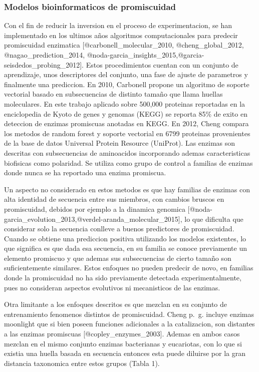 \documentclass[]{article}
\begin{document}
\subsubsection{Modelos bioinformaticos de
promiscuidad}\label{modelos-bioinformaticos-de-promiscuidad}

Con el fin de reducir la inversion en el proceso de experimentacion, se
han implementado en los ultimos años algoritmos computacionales para
predecir promiscuidad enzimatica {[}@carbonell\_molecular\_2010,
@cheng\_global\_2012, @nagao\_prediction\_2014,
@noda-garcia\_insights\_2015,@garcia-seisdedos\_probing\_2012{]}. Estos
procedimientos cuentan con un conjunto de aprendizaje, unos descriptores
del conjunto, una fase de ajuste de parametros y finalmente una
prediccion. En 2010, Carbonell propone un algoritmo de soporte vectorial
basado en subsecuencias de distinto tamaño que llama huellas
moleculares. En este trabajo aplicado sobre 500,000 proteinas reportadas
en la enciclopedia de Kyoto de genes y genomas (KEGG) se reporta 85\% de
exito en deteccion de enzimas promiscuas anotadas en KEGG. En 2012,
Cheng compara los metodos de random forest y soporte vectorial en 6799
proteinas provenientes de la base de datos Universal Protein Resource
(UniProt). Las enzimas son descritas con subsecuencias de aminoacidos
incorporando ademas caracteristicas biofisicas como polaridad. Se
utiliza como grupo de control a familias de enzimas donde nunca se ha
reportado una enzima promiscua.

Un aspecto no considerado en estos metodos es que hay familias de
enzimas con alta identidad de secuencia entre sus miembros, con cambios
bruscos en promiscuidad, debidos por ejemplo a la dinamica genomica
{[}@noda-garcia\_evolution\_2013,@verdel-aranda\_molecular\_2015{]}, lo
que dificulta que considerar solo la secuencia conlleve a buenos
predictores de promiscuidad. Cuando se obtiene una prediccion positiva
utilizando los modelos existentes, lo que significa es que dada esa
secuencia, en su familia se conoce previamente un elemento promiscuo y
que ademas sus subsecuencias de cierto tamaño son suficientemente
similares. Estos enfoques no pueden predecir de novo, en familias donde
la promiscuidad no ha sido previamente detectada experimentalmente, pues
no consideran aspectos evolutivos ni mecanisticos de las enzimas.

Otra limitante a los enfoques descritos es que mezclan en su conjunto de
entrenamiento fenomenos distintos de promiscuidad. Cheng p.~g. incluye
enzimas moonlight que si bien poseen funciones adicionales a la
catalizacion, son distantes a las enzimas promiscuas
{[}@copley\_enzymes\_2003{]}. Ademas en ambos casos mezclan en el mismo
conjunto enzimas bacterianas y eucariotas, con lo que si existia una
huella basada en secuencia entonces esta puede diluirse por la gran
distancia taxonomica entre estos grupos (Tabla 1).
\end{document}
